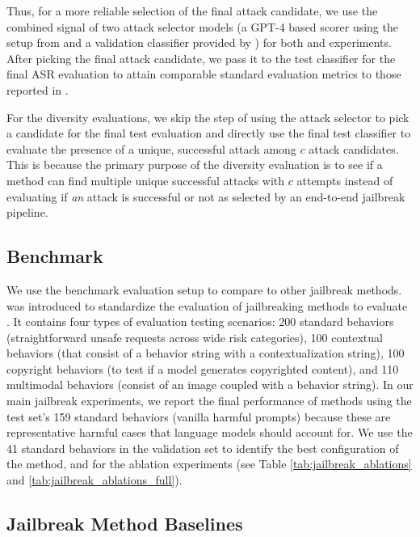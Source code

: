 Thus, for a more reliable selection of the final attack candidate, we use the combined signal of two attack selector models (a GPT-4 based scorer using the setup from \pair and a validation classifier provided by \harmbench) for both \method and \pair experiments. After picking the final attack candidate, we pass it to the \harmbench test classifier for the final ASR evaluation to attain comparable standard evaluation metrics to those reported in \harmbench.

For the diversity evaluations, we skip the step of using the attack selector to pick a candidate for the final test evaluation and directly use the final test classifier to evaluate the presence of a unique, successful attack among $c$ attack candidates. This is because the primary purpose of the diversity evaluation is to see if a method can find multiple unique successful attacks with $c$ attempts instead of evaluating if \textit{an} attack is successful or not as selected by an end-to-end jailbreak pipeline.

\subsection{\harmbench Benchmark}

We use the \harmbench benchmark \citep{mazeika2024harmbench} evaluation setup to compare \method to other jailbreak methods. \harmbench was introduced to standardize the evaluation of jailbreaking methods to evaluate \method. It contains four types of evaluation testing scenarios: 200 standard behaviors (straightforward unsafe requests across wide risk categories), 100 contextual behaviors (that consist of a behavior string with a contextualization string), 100 copyright behaviors (to test if a model generates copyrighted content), and 110 multimodal behaviors (consist of an image coupled with a behavior string). In our main jailbreak experiments, we report the final performance of methods using the test set's 159 standard behaviors (vanilla harmful prompts) because these are representative harmful cases that language models should account for. We use the 41 standard behaviors in the validation set to identify the best configuration of the method, and for the ablation experiments (see Table \ref{tab:jailbreak_ablations} and \ref{tab:jailbreak_ablations_full}).

\subsection{Jailbreak Method Baselines}

